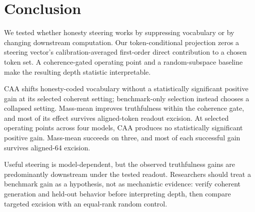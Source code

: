 \section{Conclusion}\label{sec:conclusion}

We tested whether honesty steering works by suppressing vocabulary or by changing downstream computation. Our token-conditional projection zeros a steering vector's calibration-averaged first-order direct contribution to a chosen token set. A coherence-gated operating point and a random-subspace baseline make the resulting depth statistic interpretable.

CAA shifts honesty-coded vocabulary without a statistically significant positive gain at its selected coherent setting; benchmark-only selection instead chooses a collapsed setting. Mass-mean improves truthfulness within the coherence gate, and most of its effect survives aligned-token readout excision. At selected operating points across four models, CAA produces no statistically significant positive gain. Mass-mean succeeds on three, and most of each successful gain survives aligned-64 excision.

Useful steering is model-dependent, but the observed truthfulness gains are predominantly downstream under the tested readout. Researchers should treat a benchmark gain as a hypothesis, not as mechanistic evidence: verify coherent generation and held-out behavior before interpreting depth, then compare targeted excision with an equal-rank random control.
